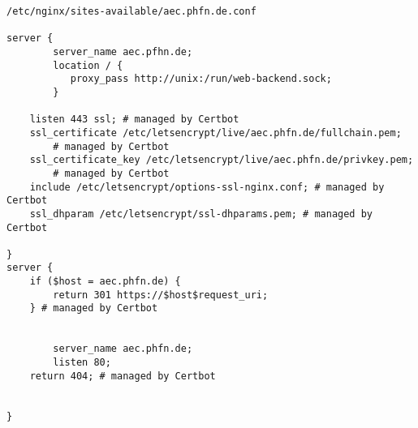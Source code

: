 \begin{verbatim}
/etc/nginx/sites-available/aec.phfn.de.conf

server {
        server_name aec.pfhn.de;
        location / {
           proxy_pass http://unix:/run/web-backend.sock;
        }
 
    listen 443 ssl; # managed by Certbot
    ssl_certificate /etc/letsencrypt/live/aec.phfn.de/fullchain.pem;
	    # managed by Certbot
    ssl_certificate_key /etc/letsencrypt/live/aec.phfn.de/privkey.pem;
	    # managed by Certbot
    include /etc/letsencrypt/options-ssl-nginx.conf; # managed by Certbot
    ssl_dhparam /etc/letsencrypt/ssl-dhparams.pem; # managed by Certbot
 
}
server {
    if ($host = aec.phfn.de) {
        return 301 https://$host$request_uri;
    } # managed by Certbot
 
 
        server_name aec.phfn.de;
        listen 80;
    return 404; # managed by Certbot
 
 
}
\end{verbatim}
